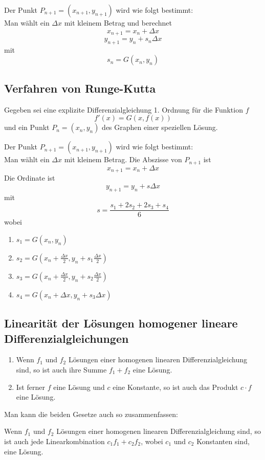 \documentclass[10pt,a4paper]{scrartcl}
\begin{document}
Der Punkt $P_{n+1} = (x_{n+1}, y_{n+1})$ wird wie folgt bestimmt:\\
Man wählt ein $\Delta{x}$ mit kleinem Betrag und berechnet
$$x_{n+1} = x_n + \Delta x$$
$$y_{n+1} = y_n + s_n\Delta x$$
mit
$$s_n = G(x_n,y_n)$$


\subsection{Verfahren von Runge-Kutta}

Gegeben sei eine explizite Differenzialgleichung 1. Ordnung für die Funktion $f$
$$f'(x) = G(x, f(x))$$
und ein Punkt $P_n = (x_n, y_n)$ des Graphen einer speziellen Lösung.

Der Punkt $P_{n+1} = (x_{n+1},y_{n+1})$ wird wie folgt bestimmt:\\
Man wählt ein $\Delta{x}$ mit kleinem Betrag. Die Abszisse von $P_{n+1}$ ist
$$x_{n+1} = x_n + \Delta x$$
Die Ordinate ist
$$y_{n+1} = y_n + s\Delta x$$
mit
$$s = \frac{s_1 + 2s_2 + 2s_3 + s_4}{6}$$
wobei
\begin{enumerate}
    \item $\displaystyle s_1 = G(x_n, y_n)$
    \item $\displaystyle s_2 = G\left(x_n + \frac{\Delta{x}}{2}, y_n + s_1
        \frac{\Delta x}{2}\right)$
    \item $\displaystyle s_3 = G\left(x_n + \frac{\Delta{x}}{2}, y_n + s_2
        \frac{\Delta x}{2}\right)$
    \item $\displaystyle s_4 = G(x_n+\Delta x, y_n+s_3\Delta x)$
\end{enumerate}


\subsection{Linearität der Lösungen homogener lineare Differenzialgleichungen}

\begin{enumerate}
    \item Wenn $f_1$ und $f_2$ Lösungen einer homogenen linearen
        Differenzialgleichung sind, so ist auch ihre Summe $f_1 + f_2$ eine
        Lösung.
    \item Ist ferner $f$ eine Lösung und $c$ eine Konstante, so ist auch das
        Produkt $c \cdot f$ eine Lösung.
\end{enumerate}

Man kann die beiden Gesetze auch so zusammenfassen:

Wenn $f_1$ und $f_2$ Lösungen einer homogenen linearen Differenzialgleichung
sind, so ist auch jede Linearkombination $c_1f_1 + c_2f_2$, wobei $c_1$ und
$c_2$ Konstanten sind, eine Lösung.
\end{document}
